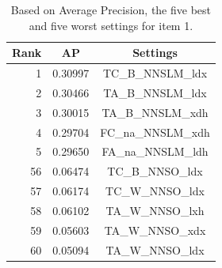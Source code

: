 \documentclass[11pt,letterpaper]{article}
\begin{document}
\begin{table}[htb!]
\begin{center}
\begin{tabular}{|r|c|c|}
 \hline
 Rank & AP & Settings \\
 \hline
 \hline
1 & 0.30997 & TC\_B\_NNSLM\_ldx \\
\hline
2 & 0.30466 & TA\_B\_NNSLM\_ldx \\
\hline
3 & 0.30015 & TA\_B\_NNSLM\_xdh \\
\hline
4 & 0.29704 & FC\_na\_NNSLM\_xdh \\
\hline
5 & 0.29650 & FA\_na\_NNSLM\_ldh \\
 \hline
 \hline
56 & 0.06474 & TC\_B\_NNSO\_ldx \\
\hline
57 & 0.06174 & TC\_W\_NNSO\_ldx \\
\hline
58 & 0.06102 & TA\_W\_NNSO\_lxh \\
\hline
59 & 0.05603 & TA\_W\_NNSO\_xdx \\
\hline
60 & 0.05094 & TA\_W\_NNSO\_ldx \\
 \hline
\end{tabular}
\caption{Based on Average Precision, the five best and five worst settings for item 1.}
\label{tab:i01-dist-ranked-settings}
\end{center}
\end{table}
\end{document}
